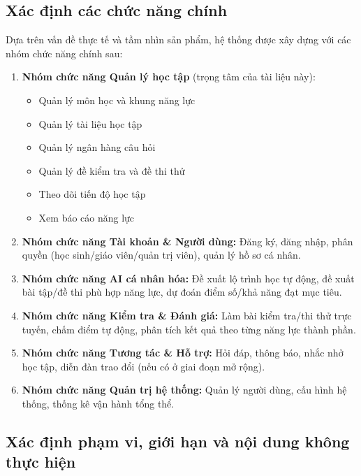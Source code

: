 \documentclass[12pt,a4paper]{article}
\begin{document}
	\subsection{Xác định các chức năng chính}
	
	Dựa trên vấn đề thực tế và tầm nhìn sản phẩm, hệ thống được xây dựng với các nhóm chức năng chính sau:
	
	\begin{enumerate}[label=\Alph*.]
		\item \textbf{Nhóm chức năng Quản lý học tập} (trọng tâm của tài liệu này):
		\begin{itemize}[nosep]
			\item Quản lý môn học và khung năng lực
			\item Quản lý tài liệu học tập
			\item Quản lý ngân hàng câu hỏi
			\item Quản lý đề kiểm tra và đề thi thử
			\item Theo dõi tiến độ học tập
			\item Xem báo cáo năng lực
		\end{itemize}
		\item \textbf{Nhóm chức năng Tài khoản \& Người dùng:} Đăng ký, đăng nhập, phân quyền (học sinh/giáo viên/quản trị viên), quản lý hồ sơ cá nhân.
		\item \textbf{Nhóm chức năng AI cá nhân hóa:} Đề xuất lộ trình học tự động, đề xuất bài tập/đề thi phù hợp năng lực, dự đoán điểm số/khả năng đạt mục tiêu.
		\item \textbf{Nhóm chức năng Kiểm tra \& Đánh giá:} Làm bài kiểm tra/thi thử trực tuyến, chấm điểm tự động, phân tích kết quả theo từng năng lực thành phần.
		\item \textbf{Nhóm chức năng Tương tác \& Hỗ trợ:} Hỏi đáp, thông báo, nhắc nhở học tập, diễn đàn trao đổi (nếu có ở giai đoạn mở rộng).
		\item \textbf{Nhóm chức năng Quản trị hệ thống:} Quản lý người dùng, cấu hình hệ thống, thống kê vận hành tổng thể.
	\end{enumerate}
	
	\subsection{Xác định phạm vi, giới hạn và nội dung không thực hiện}
	
\end{document}
